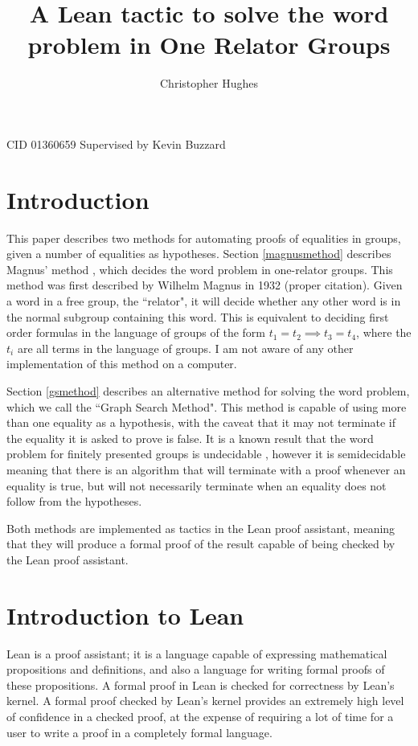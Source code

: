 \documentclass[12pt]{article} %
\title{A Lean tactic to solve the word problem in One Relator Groups}
\author{Christopher Hughes}
\theoremstyle{definition}
\theoremstyle{definition}
\theoremstyle{definition}
\theoremstyle{definition}
\theoremstyle{definition}
\theoremstyle{definition}
\begin{document}
\maketitle
CID 01360659 \newline
Supervised by Kevin Buzzard
\pagebreak
\tableofcontents
\pagebreak

\section{Introduction}

This paper describes two methods for automating proofs of equalities in groups, given
a number of equalities as hypotheses. Section \ref{magnusmethod} describes Magnus' method
\cite{mccool_schupp_1973}, which decides the word problem in one-relator groups.
This method was first described by Wilhelm Magnus in 1932 (proper citation). Given a word in
a free group, the ``relator", it will decide whether any other word is in the
normal subgroup containing this word. This is equivalent to deciding first order
formulas in the language of groups of the form $t_1 = t_2 \implies t_3 = t_4$,
where the $t_i$ are all terms in the language of groups.
I am not aware of any other implementation of this method on a computer.

Section \ref{gsmethod} describes an alternative method for solving the word problem,
which we call the ``Graph Search Method".
This method is capable of using more than one equality as a hypothesis,
with the caveat that it may not terminate if the equality it is asked to prove is false.
It is a known result that the word problem for finitely presented groups is undecidable
\cite{collins1986}, however it is semidecidable meaning that  there is an algorithm
that will terminate with a proof whenever an equality is true, but will not necessarily
terminate when an equality does not follow from the hypotheses.

Both methods are implemented as tactics in the Lean proof assistant, meaning that
they will produce a formal proof of the result capable of being checked by the Lean
proof assistant.

\section{Introduction to Lean}

Lean \cite{de_moura_kong_avigad_van_doorn_von_raumer_2018} is a proof assistant;
it is a language capable of expressing mathematical propositions
and definitions, and also a language for writing formal proofs of these propositions.
A formal proof in Lean is checked for correctness by Lean's kernel.
A formal proof checked by Lean's kernel provides
an extremely high level of confidence in a checked proof, at the expense of requiring a lot
of time for a user to write a proof in a completely formal language.
\end{document}
